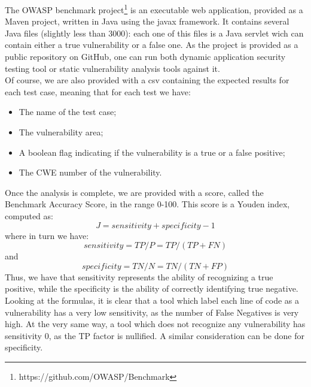 \documentclass[../Report.tex]{subfiles}
\begin{document}
The OWASP benchmark project\footnote{https://github.com/OWASP/Benchmark} is an executable web application, provided as a Maven project, written in Java using the javax framework. It contains several Java files (slightly less than 3000): each one of this files is a Java servlet wich can contain either a true vulnerability or a false one. As the project is provided as a public repository on GitHub, one can run both dynamic application security testing tool or static vulnerability analysis tools against it. \\
Of course, we are also provided with a csv containing the expected results for each test case, meaning that for each test we have:
\begin{itemize}
	\item The name of the test case;
	\item The vulnerability area;
	\item A boolean flag indicating if the vulnerability is a true or a false positive;
	\item The CWE number of the vulnerability.
\end{itemize}
Once the analysis is complete, we are provided with a score, called the Benchmark Accuracy Score, in the range 0-100. This score is a Youden index, computed as:
\[ J = sensitivity + specificity - 1 \]
where in turn we have:
\[ sensitivity = TP/P = TP/(TP + FN) \]
and
\[ specificity = TN/N = TN/(TN + FP) \]
Thus, we have that sensitivity represents the ability of recognizing a true positive, while the specificity is the ability of correctly identifying true negative. Looking at the formulas, it is clear that a tool which label each line of code as a vulnerability has a very low sensitivity, as the number of False Negatives is very high. At the very same way, a tool which does not recognize any vulnerability has sensitivity 0, as the TP factor is nullified. A similar consideration can be done for specificity.
\end{document}
